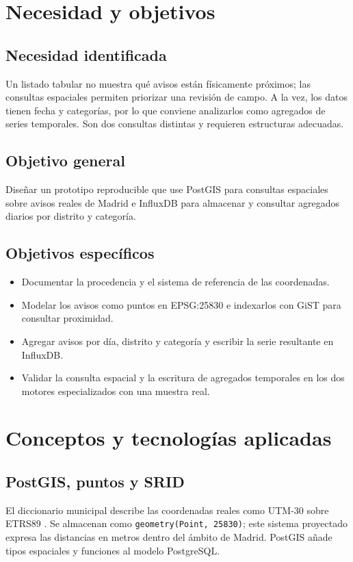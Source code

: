 \documentclass[a4paper,12pt]{article}
\begin{document}
\section{Necesidad y objetivos}
\subsection{Necesidad identificada}
Un listado tabular no muestra qué avisos están físicamente próximos; las consultas espaciales permiten priorizar una revisión de campo. A la vez, los datos tienen fecha y categorías, por lo que conviene analizarlos como agregados de series temporales. Son dos consultas distintas y requieren estructuras adecuadas.
\subsection{Objetivo general}
Diseñar un prototipo reproducible que use PostGIS para consultas espaciales sobre avisos reales de Madrid e InfluxDB para almacenar y consultar agregados diarios por distrito y categoría.
\subsection{Objetivos específicos}
\begin{itemize}[leftmargin=1.2cm]
\item Documentar la procedencia y el sistema de referencia de las coordenadas.
\item Modelar los avisos como puntos en EPSG:25830 e indexarlos con GiST para consultar proximidad.
\item Agregar avisos por día, distrito y categoría y escribir la serie resultante en InfluxDB.
\item Validar la consulta espacial y la escritura de agregados temporales en los dos motores especializados con una muestra real.
\end{itemize}
\section{Conceptos y tecnologías aplicadas}
\subsection{PostGIS, puntos y SRID}
El diccionario municipal describe las coordenadas reales como UTM-30 sobre ETRS89 \cite{diccionario}. Se almacenan como \texttt{geometry(Point, 25830)}; este sistema proyectado expresa las distancias en metros dentro del ámbito de Madrid. PostGIS añade tipos espaciales y funciones al modelo PostgreSQL.
\end{document}
